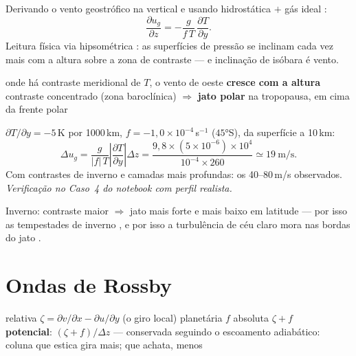 \documentclass[11pt]{article}
\begin{document}
\begin{formadif}
Derivando o vento geostrófico  na vertical e
usando hidrostática $+$ gás ideal :
\[ \frac{\partial u_g}{\partial z} = -\frac{g}{f\,T}\,
   \frac{\partial T}{\partial y}. \]
Leitura física via hipsométrica :
as superfícies de pressão se inclinam cada vez mais com a altura sobre a
zona de contraste — e inclinação de isóbara é vento.
\end{formadif}

\begin{noquadro}
onde há contraste meridional de $T$, o vento de oeste \textbf{cresce
com a altura}\\
contraste concentrado (zona baroclínica) $\Rightarrow$ \textbf{jato
polar} na tropopausa, em cima da frente polar
\end{noquadro}

\begin{exemplo}
$\partial T/\partial y = -5$\,K por 1000\,km,
$f = -1{,}0\times10^{-4}$\,s$^{-1}$ ($45°$S), da superfície a 10\,km:
\[ \Delta u_g = \frac{g}{|f|\,T}
\left|\frac{\partial T}{\partial y}\right|\Delta z
 = \frac{9{,}8\times(5\times10^{-6})\times10^{4}}{10^{-4}\times260}
 \simeq 19\ \mathrm{m/s}. \]
Com contrastes de inverno e camadas mais profundas: os 40--80\,m/s
observados. \emph{Verificação no Caso~4 do notebook com perfil
realista.}
\end{exemplo}

Inverno: contraste maior $\Rightarrow$ jato mais forte e mais baixo em
latitude — por isso as tempestades de inverno
, e por isso a turbulência de céu
claro mora nas bordas do jato .

\section{Ondas de Rossby}\label{sec:rossby}

\begin{noquadro}
relativa $\zeta = \partial v/\partial x - \partial u/\partial y$
(o giro local) \quad planetária $f$ \quad absoluta $\zeta + f$\\
\textbf{potencial}: $(\zeta + f)/\Delta z$ — conservada seguindo o
escoamento adiabático:\\
coluna que estica gira mais; que achata, menos
\end{noquadro}
\end{document}
